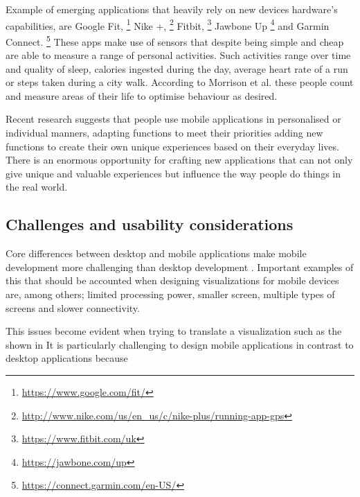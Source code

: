 Example of emerging applications that heavily rely on new devices hardware's capabilities, are Google Fit, \footnote{\url{https://www.google.com/fit/}} Nike +, \footnote{\url{http://www.nike.com/us/en_us/c/nike-plus/running-app-gps}} Fitbit, \footnote{\url{https://www.fitbit.com/uk}} Jawbone Up \footnote{\url{https://jawbone.com/up}} and Garmin Connect. \footnote{\url{https://connect.garmin.com/en-US/}} These apps make use of sensors that despite being simple and cheap are able to measure a range of personal activities. Such activities range over time and quality of sleep, calories ingested during the day, average heart rate of a run or steps taken during a city walk. According to Morrison et al. \cite{Rooksby2014} these people count and measure areas of their life to optimise behaviour as desired.

Recent research \cite{Barkhuus2011} suggests that people use mobile applications in personalised or individual manners, adapting functions to meet their priorities adding new functions to create their own unique experiences based on their everyday lives. There is an enormous opportunity for crafting new applications that can not only  give unique and valuable experiences but influence the way people do things in the real world. 

\subsection{Challenges and usability considerations}

Core differences between desktop and mobile applications make mobile development more challenging than desktop development \cite{Chittaro2006}. Important examples of this that should be accounted when designing visualizations for mobile devices are, among others; limited processing power, smaller screen, multiple types of screens and slower connectivity. \iffalse

This issues become evident when trying to translate a visualization such as the shown in 
It is particularly challenging to design mobile applications in contrast to desktop applications because 


